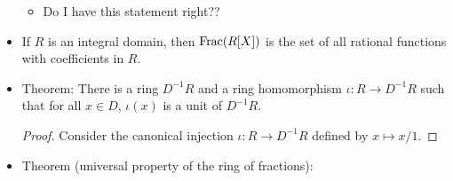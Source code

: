 \documentclass[../notes.tex]{subfiles}
\begin{document}
\begin{itemize}
    \begin{itemize}
        \item Do I have this statement right??
    \end{itemize}
    \item If $R$ is an integral domain, then $\operatorname{Frac}(R[X])$ is the set of all rational functions with coefficients in $R$.
    \item Theorem: There is a ring $D^{-1}R$ and a ring homomorphism $\iota:R\to D^{-1}R$ such that for all $x\in D$, $\iota(x)$ is a unit of $D^{-1}R$.
    \begin{proof}
        Consider the canonical injection $\iota:R\to D^{-1}R$ defined by $x\mapsto x/1$.
    \end{proof}
    \item Theorem (universal property of the ring of fractions):
    \begin{figure}[H]
        \centering
\end{figure}
\end{itemize}
\end{document}
